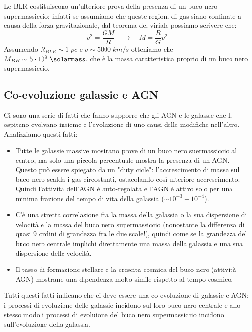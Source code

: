 Le BLR costituiscono un'ulteriore prova della presenza di un buco nero supermassiccio; infatti se assumiamo che queste regioni di gas siano confinate a causa della forza gravitazionale, dal teorema del viriale possiamo scrivere che:
\begin{equation*}
    v^2 = \frac{GM}{R} \quad \rightarrow \quad M = \frac{R}{G} v^2
\end{equation*}
Assumendo $R_{BLR}\sim 1 \;\si{pc}$ e $v \sim 5000 \;\si{km}/\si{s}$ otteniamo che $M_{BH} \sim 5 \cdot 10^9 \;\si{\solarmass}$, che è la massa caratteristica proprio di un buco nero supermassiccio.

\subsection{Co-evoluzione galassie e AGN} \label{co-evoluzione-galassie-agn}
Ci sono una serie di fatti che fanno supporre che gli AGN e le galassie che li ospitano evolvano insieme e l'evoluzione di uno causi delle modifiche nell'altro. Analizziamo questi fatti:
\begin{itemize}
    \item Tutte le galassie massive mostrano prove di un buco nero suermassiccio al centro, ma solo una piccola percentuale mostra la presenza di un AGN. Questo può essere spiegato da un "duty cicle": l'accrescimento di massa sul buco nero scalda i gas circostanti, ostacolando così ulteriore accrescimento. Quindi l'attività dell'AGN è auto-regolata e l'AGN è attivo solo per una minima frazione del tempo di vita della galassia ($\sim 10^{-3}-10^{-4}$).
    \item C'è una stretta correlazione fra la massa della galassia o la sua dispersione di velocità e la massa del buco nero supermassiccio (nonostante la differenza di quasi 9 ordini di grandezza fra le due scale!), quindi come se la grandezza del buco nero centrale implichi direttamente una massa della galassia e una sua dispersione delle velocità.
    \item Il tasso di formazione stellare e la crescita cosmica del buco nero (attività AGN) mostrano una dipendenza molto simile rispetto al tempo cosmico.
\end{itemize}

Tutti questi fatti indicano che ci deve essere una co-evoluzione di galassie e AGN: i processi di evoluzione delle galassie incidono sul loro buco nero centrale e allo stesso modo i processi di evoluione del buco nero supermassiccio incidono sull'evoluzione della galassia.

